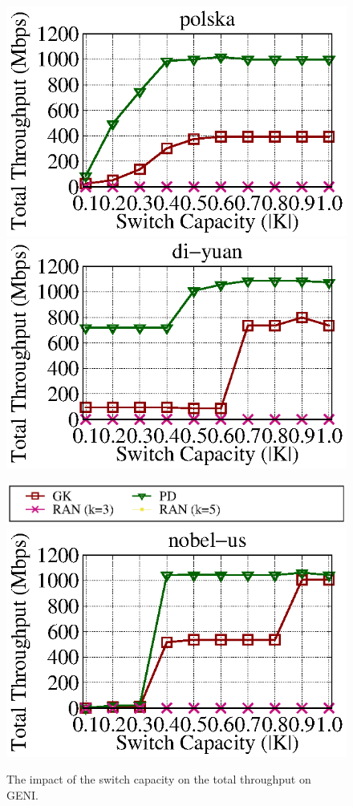 \documentclass[a4paper,12pt]{report}
\begin{document}
\begin{large}
\begin{figure}[ht]
	  \includegraphics[width=1.0\textwidth]{polska_geni_throughput_e05.eps}
	  \includegraphics[width=1.0\textwidth]{di-yuan_geni_throughput_e05.eps}
  \end{figure}
  \begin{figure}[ht]
    \caption{The impact of the switch capacity on the total throughput on GENI.}
	\centering
	  \includegraphics[width=1.0\textwidth]{lambda_legend.eps}
	  \includegraphics[width=1.0\textwidth]{nobel-us_geni_throughput_e05.eps}

\end{figure}
\end{large}
\end{document}
